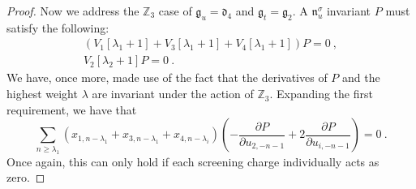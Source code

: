 \documentclass[10pt,a4paper]{amsart}
\def\IZ{\mathbb{Z}}
\def\df{\mathfrak{d}}
\def\gf{\mathfrak{g}}
\begin{document}
\begin{proof}
Now we address the $\IZ_3$ case of $\gf_u=\df_4$ and $\gf_t=\gf_2$. A $\mathfrak{n}_u^\sigma$ invariant $P$ must satisfy the following:
\begin{equation}
	\begin{split}
	(V_{1}[\lambda_1+1] + V_{3}[\lambda_1+1]+V_4[\lambda_1+1])P=0~,\\
	V_{2}[\lambda_2+1]P=0~.
	\end{split}
\end{equation}
We have, once more, made use of the fact that the derivatives of $P$ and the highest weight $\lambda$ are invariant under the action of $\IZ_3$. Expanding the first requirement, we have that
\begin{equation}
	\sum_{n\ge\lambda_1} \left(x_{1,n-\lambda_1}+ x_{3,n-\lambda_1}+x_{4,n-\lambda_i}\right) \left( -\frac{\partial P}{\partial u_{2,-n-1}} + 2 \frac{\partial P}{\partial u_{i,-n-1}} \right) =0~.
\end{equation}
Once again, this can only hold if each screening charge individually acts as zero.
\end{proof}
\end{document}

